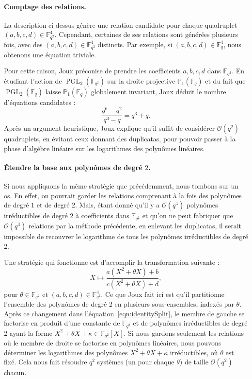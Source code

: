 \documentclass[a4paper, titlepage, 11pt]{article}
\theoremstyle{definition}
\theoremstyle{remark}
\def\O{\mathcal O}
\def\gf #1{\mathbb{F}_{#1}}
\begin{document}
\paragraph{Comptage des relations.}La description ci-dessus génère une relation candidate pour chaque quadruplet $(a,b,c,d) \in \gf{q^2}^4$. Cependant, certaines de ses relations sont générées plusieurs fois, avec des $(a,b,c,d)\in\gf{q^2}^4$ distincts. Par exemple, si $(a,b,c,d)\in\gf{q}^4$, nous obtenons une équation triviale.

Pour cette raison, Joux \cite{joux2013} préconise de prendre les coefficients $a,b,c,d$ dans $\gf{q^2}$. En étudiant l'action de $\operatorname{PGL}_2(\gf{q^2})$ sur la droite projective $\mathbb{P}_1(\gf{q})$ et du fait que $\operatorname{PGL}_2(\gf{q})$ laisse $\mathbb{P}_1(\gf{q})$ globalement invariant, Joux déduit le nombre d'équations candidates : 
$$\frac{q^6 - q^2}{q^3 - q} = q^3 + q.$$
Après un argument heuristique, Joux \cite{joux2013} explique qu'il suffit de considérer $\O(q^2)$ quadruplets, en évitant ceux donnant des duplicatas, pour pouvoir passer à la phase d'algèbre linéaire sur les logarithmes des polynômes linéaires.

\paragraph{Étendre la base aux polynômes de degré $2$.} Si nous appliquons la même stratégie que précédemment, nous tombons sur un os. En effet, on pourrait garder les relations comprenant à la fois des polynômes de degré $1$ et de degré $2$. Mais, étant donné qu'il y a $\O(q^4)$ polynômes irréductibles de degré $2$ à coefficients dans $\gf{q^2}$ et qu'on ne peut fabriquer que $\O(q^3)$ relations par la méthode précédente, en enlevant les duplicatas, il serait impossible de recouvrer le logarithme de tous les polynômes irréductibles de degré $2$.

Une stratégie qui fonctionne est d'accomplir la transformation suivante :
$$X \mapsto \frac{a(X^2+\theta X) + b}{c(X^2 + \theta X) +d},$$
pour $\theta \in \gf{q^2}$ et $(a,b,c,d) \in \gf{q^2}^4$. Ce que Joux \cite{joux2013} fait ici est qu'il partitionne l'ensemble des polynômes de degré $2$ en plusieurs sous-ensembles, indexés par $\theta$. Après ce changement dans l'équation~\ref{eqn:identitySplit}, le membre de gauche se factorise en  produit d'une constante de $\gf{q^2}$ et de polynômes irréductibles de degré $2$ ayant la forme $X^2 + \theta X + \kappa \in \gf{q^2}[X]$. Si nous gardons seulement les relations où le membre de droite se factorise en polynômes linéaires, nous pouvons déterminer les logarithmes des polynômes $X^2 +\theta X + \kappa$ irréductibles, où $\theta$ est fixé. Cela nous fait résoudre $q^2$ systèmes (un pour chaque $\theta$) de taille $\O(q^2)$ chacun.
\end{document}

